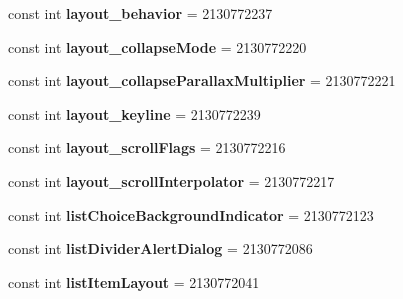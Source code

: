 \begin{DoxyCompactItemize}
const int {\bfseries layout\+\_\+behavior} = 2130772237
\item 
\mbox{\label{class_pinned_app_1_1_droid_1_1_resource_1_1_attribute_a5ee84406bab91d7661dbdd5a3608e315}} 
const int {\bfseries layout\+\_\+collapse\+Mode} = 2130772220
\item 
\mbox{\label{class_pinned_app_1_1_droid_1_1_resource_1_1_attribute_a291a0919d4dfe494a59ffd34ada24ac7}} 
const int {\bfseries layout\+\_\+collapse\+Parallax\+Multiplier} = 2130772221
\item 
\mbox{\label{class_pinned_app_1_1_droid_1_1_resource_1_1_attribute_ab920f3e4fd5d24793a3aa77e47e824ee}} 
const int {\bfseries layout\+\_\+keyline} = 2130772239
\item 
\mbox{\label{class_pinned_app_1_1_droid_1_1_resource_1_1_attribute_af34db4c0f16e4e2847d5489ced8ef06f}} 
const int {\bfseries layout\+\_\+scroll\+Flags} = 2130772216
\item 
\mbox{\label{class_pinned_app_1_1_droid_1_1_resource_1_1_attribute_aa883fa78c43df94f66b8647d722b3801}} 
const int {\bfseries layout\+\_\+scroll\+Interpolator} = 2130772217
\item 
\mbox{\label{class_pinned_app_1_1_droid_1_1_resource_1_1_attribute_a49da907f7849327117000db704bb8335}} 
const int {\bfseries list\+Choice\+Background\+Indicator} = 2130772123
\item 
\mbox{\label{class_pinned_app_1_1_droid_1_1_resource_1_1_attribute_a791f6224dd2187dd6aa152c64dfe0909}} 
const int {\bfseries list\+Divider\+Alert\+Dialog} = 2130772086
\item 
\mbox{\label{class_pinned_app_1_1_droid_1_1_resource_1_1_attribute_a29c8541326698659a8d8195b0016d424}} 
const int {\bfseries list\+Item\+Layout} = 2130772041
\item 

\end{DoxyCompactItemize}
